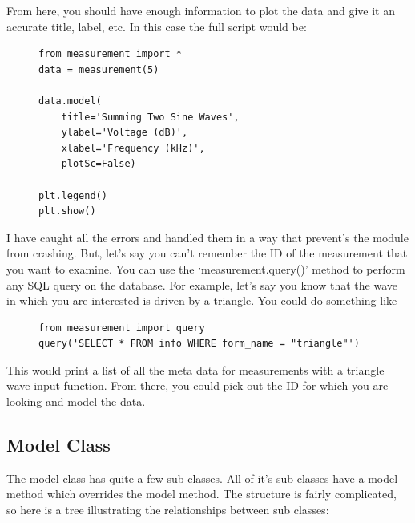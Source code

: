 \documentclass{article}
\begin{document}
From here, you should have enough information to plot the data and give it
an accurate title, label, etc. In this case the full script would be:

\begin{figure}[H]
\centering
\begin{minipage}{1\textwidth}
\begin{tcolorbox}
\begin{verbatim}
from measurement import *
data = measurement(5)

data.model(
    title='Summing Two Sine Waves', 
    ylabel='Voltage (dB)', 
    xlabel='Frequency (kHz)', 
    plotSc=False)

plt.legend()
plt.show()
\end{verbatim}
\end{tcolorbox}
\end{minipage}
\end{figure}

I have caught all the errors and handled them in a way that prevent's the
module from crashing. But, let's say you can't remember the ID of the
measurement that you want to examine. You can use the `measurement.query()'
method to perform any SQL query on the database. For example, let's say you
know that the wave in which you are interested is driven by a triangle. You
could do something like

\begin{figure}[H]
\centering
\begin{minipage}{1\textwidth}
\begin{tcolorbox}
\begin{verbatim}
from measurement import query
query('SELECT * FROM info WHERE form_name = "triangle"')
\end{verbatim}
\end{tcolorbox}
\end{minipage}
\end{figure}

This would print a list of all the meta data for measurements with a triangle
wave input function. From there, you could pick out the ID for which you are
looking and model the data.

\subsection{Model Class}%
\label{sub:model_class}

The model class has quite a few sub classes. All of it's sub classes have a
model method which overrides the model method. The structure is fairly
complicated, so here is a tree illustrating the relationships between sub
classes:
\end{document}
